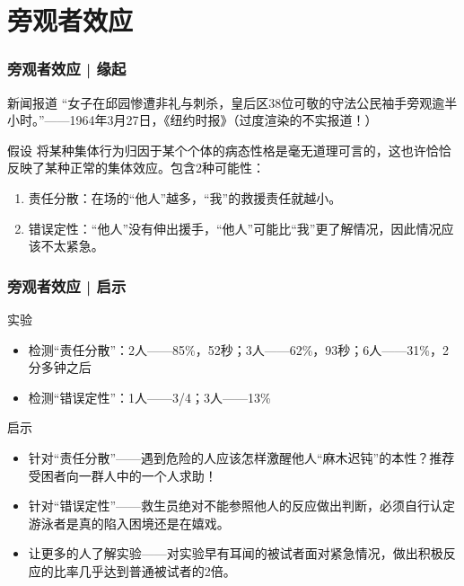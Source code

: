 \section{旁观者效应}
\begin{frame}
  \frametitle{旁观者效应 | 缘起}
  \begin{block}{新闻报道}
    “女子在邱园惨遭非礼与刺杀，皇后区38位可敬的守法公民袖手旁观逾半小时。”——1964年3月27日，《纽约时报》（过度渲染的不实报道！）
  \end{block}
  \pause
  \begin{block}{假设}
    将某种集体行为归因于某个个体的病态性格是毫无道理可言的，这也许恰恰反映了某种正常的集体效应。包含2种可能性：
    \begin{enumerate}
      \item 责任分散：在场的“他人”越多，“我”的救援责任就越小。
      \item 错误定性：“他人”没有伸出援手，“他人”可能比“我”更了解情况，因此情况应该不太紧急。
    \end{enumerate}
  \end{block}
\end{frame}

\begin{frame}
  \frametitle{旁观者效应 | 启示}
  \begin{block}{实验}
    \begin{itemize}
      \item 检测“责任分散”：2人——85\%，52秒；3人——62\%，93秒；6人——31\%，2分多钟之后
      \item 检测“错误定性”：1人——3/4；3人——13\%
    \end{itemize}
  \end{block}
  \pause
  \begin{block}{启示}
    \begin{itemize}
      \item 针对“责任分散”——遇到危险的人应该怎样激醒他人“麻木迟钝”的本性？推荐受困者向一群人中的一个人求助！
      \item 针对“错误定性”——救生员绝对不能参照他人的反应做出判断，必须自行认定游泳者是真的陷入困境还是在嬉戏。
      \item 让更多的人了解实验——对实验早有耳闻的被试者面对紧急情况，做出积极反应的比率几乎达到普通被试者的2倍。
    \end{itemize}
  \end{block}
\end{frame}

